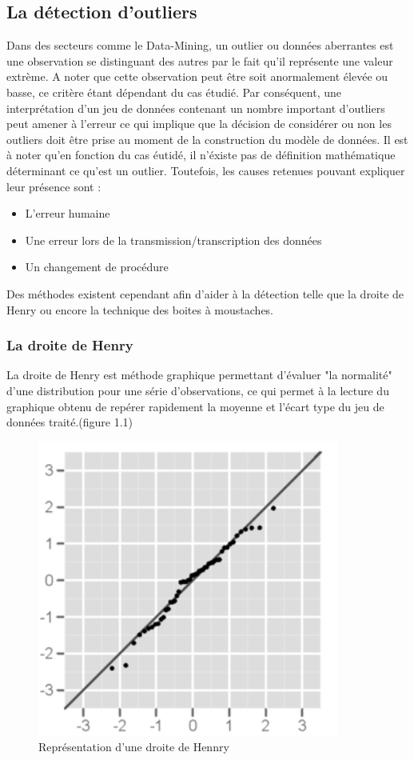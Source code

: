 \documentclass[memoire.tex]{subfiles}
\begin{document}
\subsection{La détection d'outliers}
Dans des secteurs comme le Data-Mining, un outlier ou données aberrantes est une observation se distinguant des autres par le fait qu'il représente une valeur extrème. A noter que cette observation peut être soit anormalement élevée ou basse, ce critère étant dépendant du cas étudié. Par conséquent, une interprétation d'un jeu de données contenant un nombre important d'outliers peut amener à l'erreur ce qui implique que la décision de considérer ou non les outliers doit être prise au moment de la construction du modèle de données. Il est à noter qu'en fonction du cas éutidé, il n'éxiste pas de définition mathématique déterminant ce qu'est un outlier. Toutefois, les causes retenues pouvant expliquer leur présence sont : \begin{itemize}
\item L'erreur humaine
\item Une erreur lors de la transmission/transcription des données
\item Un changement de procédure
\end{itemize}
Des méthodes existent cependant afin d'aider à la détection telle que la  droite de Henry ou encore la technique des boites à moustaches.
\subsubsection{La droite de Henry}
La droite de Henry est méthode graphique permettant d'évaluer "la normalité" d'une distribution pour une série d'observations, ce qui permet à la lecture du graphique obtenu de repérer rapidement la moyenne et l'écart type du jeu de données traité.(figure 1.1)
	\begin{figure}[h!]
		\centerline{\includegraphics[scale=0.8]{img/henry.png}}
		\caption{Représentation d'une droite de Hennry}
	\end{figure}
\end{document}
